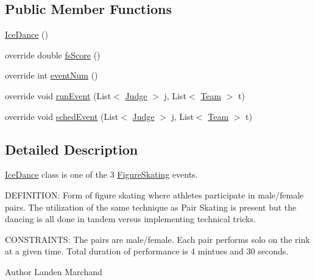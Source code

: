 \subsection*{Public Member Functions}
\begin{DoxyCompactItemize}
\item 
\hyperlink{classProject__Codename__Olympia__v1_1_1__0_1_1IceDance_a38ad77c543afbb217c4ba378a14a0427}{Ice\+Dance} ()
\item 
override double \hyperlink{classProject__Codename__Olympia__v1_1_1__0_1_1IceDance_ad7e7867e61839151b62fd0bbafc09fad}{fs\+Score} ()
\item 
override int \hyperlink{classProject__Codename__Olympia__v1_1_1__0_1_1IceDance_a075d8dca89d1ed4399ffb7c4d9825ff1}{event\+Num} ()
\item 
override void \hyperlink{classProject__Codename__Olympia__v1_1_1__0_1_1IceDance_a9c1268bc83034220bd16102d6cd66b11}{run\+Event} (List$<$ \hyperlink{classProject__Codename__Olympia__v1_1_1__0_1_1Judge}{Judge} $>$ j, List$<$ \hyperlink{classProject__Codename__Olympia__v1_1_1__0_1_1Team}{Team} $>$ t)
\item 
override void \hyperlink{classProject__Codename__Olympia__v1_1_1__0_1_1IceDance_ac95be9763d66943baf87f4533b9b2e64}{sched\+Event} (List$<$ \hyperlink{classProject__Codename__Olympia__v1_1_1__0_1_1Judge}{Judge} $>$ j, List$<$ \hyperlink{classProject__Codename__Olympia__v1_1_1__0_1_1Team}{Team} $>$ t)
\end{DoxyCompactItemize}


\subsection{Detailed Description}
\hyperlink{classProject__Codename__Olympia__v1_1_1__0_1_1IceDance}{Ice\+Dance} class is one of the 3 \hyperlink{classProject__Codename__Olympia__v1_1_1__0_1_1FigureSkating}{Figure\+Skating} events. 

D\+E\+F\+I\+N\+I\+T\+I\+ON\+: Form of figure skating where athletes participate in male/female pairs. The utilization of the same technique as Pair Skating is present but the dancing is all done in tandem versus implementing technical tricks.

C\+O\+N\+S\+T\+R\+A\+I\+N\+TS\+: The pairs are male/female. Each pair performs solo on the rink at a given time. Total duration of performance is 4 mintues and 30 seconds.\begin{DoxyAuthor}{Author}
Landen Marchand 
\end{DoxyAuthor}


